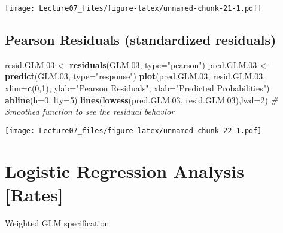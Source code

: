 \documentclass[
]{article}
\newenvironment{Shaded}{\begin{snugshade}}{\end{snugshade}}
\newcommand{\CommentTok}[1]{\textcolor[rgb]{0.56,0.35,0.01}{\textit{#1}}}
\newcommand{\DataTypeTok}[1]{\textcolor[rgb]{0.13,0.29,0.53}{#1}}
\newcommand{\DecValTok}[1]{\textcolor[rgb]{0.00,0.00,0.81}{#1}}
\newcommand{\FloatTok}[1]{\textcolor[rgb]{0.00,0.00,0.81}{#1}}
\newcommand{\KeywordTok}[1]{\textcolor[rgb]{0.13,0.29,0.53}{\textbf{#1}}}
\newcommand{\NormalTok}[1]{#1}
\newcommand{\StringTok}[1]{\textcolor[rgb]{0.31,0.60,0.02}{#1}}
\begin{document}
\texttt{[image: Lecture07\_files/figure-latex/unnamed-chunk-21-1.pdf]}

\hypertarget{pearson-residuals-standardized-residuals}{%
\subsection{Pearson Residuals (standardized
residuals)}\label{pearson-residuals-standardized-residuals}}

\begin{Shaded}
\begin{Highlighting}[]
\NormalTok{resid.GLM}\FloatTok{.03}\NormalTok{ <-}\StringTok{ }\KeywordTok{residuals}\NormalTok{(GLM}\FloatTok{.03}\NormalTok{, }\DataTypeTok{type=}\StringTok{"pearson"}\NormalTok{)   }
\NormalTok{pred.GLM}\FloatTok{.03}\NormalTok{ <-}\StringTok{ }\KeywordTok{predict}\NormalTok{(GLM}\FloatTok{.03}\NormalTok{, }\DataTypeTok{type=}\StringTok{"response"}\NormalTok{)      }
\KeywordTok{plot}\NormalTok{(pred.GLM}\FloatTok{.03}\NormalTok{, resid.GLM}\FloatTok{.03}\NormalTok{, }\DataTypeTok{xlim=}\KeywordTok{c}\NormalTok{(}\DecValTok{0}\NormalTok{,}\DecValTok{1}\NormalTok{), }
     \DataTypeTok{ylab=}\StringTok{"Pearson Residuals"}\NormalTok{, }\DataTypeTok{xlab=}\StringTok{"Predicted Probabilities"}\NormalTok{)}
\KeywordTok{abline}\NormalTok{(}\DataTypeTok{h=}\DecValTok{0}\NormalTok{, }\DataTypeTok{lty=}\DecValTok{5}\NormalTok{)}
\KeywordTok{lines}\NormalTok{(}\KeywordTok{lowess}\NormalTok{(pred.GLM}\FloatTok{.03}\NormalTok{, resid.GLM}\FloatTok{.03}\NormalTok{),}\DataTypeTok{lwd=}\DecValTok{2}\NormalTok{)  }\CommentTok{# Smoothed function to see the residual behavior}
\end{Highlighting}
\end{Shaded}

\texttt{[image: Lecture07\_files/figure-latex/unnamed-chunk-22-1.pdf]}

\hypertarget{logistic-regression-analysis-rates}{%
\section{Logistic Regression Analysis
{[}Rates{]}}\label{logistic-regression-analysis-rates}}

Weighted GLM specification
\end{document}

